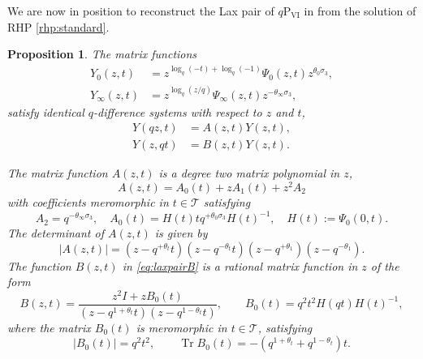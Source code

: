 \documentclass[a4paper,reqno,11pt]{amsart}
\numberwithin{equation}{section}
\numberwithin{figure}{section}
\theoremstyle{plain}
\newtheorem{proposition}[theorem]{Proposition}
\theoremstyle{remark}
\newcommand\Psix{\textrm{P}_{\textrm{VI}}}
\newcounter{rhp}
\numberwithin{rhp}{section}
\begin{document}
We are now in position to reconstruct the Lax pair of $q\Psix$ in \cite{jimbosakai} from the solution of RHP \ref{rhp:standard}.
\begin{proposition}\label{prop:lax}
    The matrix functions
\begin{align*}
Y_0(z,t)&=z^{\log_q(-t)+\log_q(-1)}\Psi_0(z,t)z^{\theta_0\sigma_3},\\
Y_\infty(z,t)&=z^{\log_q(z/q)}\Psi_\infty(z,t) z^{-\theta_\infty\sigma_3},
\end{align*}
satisfy identical $q$-difference systems with respect to $z$ and $t$,
\begin{subequations}\label{eq:laxpair}
\begin{align}
   Y(qz,t)&=A(z,t)Y(z,t),\label{eq:laxpairA}\\
   Y(z,qt)&=B(z,t)Y(z,t). \label{eq:laxpairB}
\end{align}
\end{subequations}

The matrix function $A(z,t)$ is a degree two matrix polynomial in $z$,
\begin{equation}\label{eq:lin_sys}
   A(z,t)=A_0(t)+zA_1(t)+z^2 A_2
\end{equation}
with coefficients meromorphic in $t\in \mathcal{T}$ satisfying
\begin{equation}\label{eq:Amats}
A_2= q^{-\theta_\infty \sigma_3},\quad A_0(t)=H(t)t  q^{+\theta_0 \sigma_3}  H(t)^{-1},\quad H(t):=\Psi_0(0,t).
\end{equation}
The determinant of $A(z,t)$ is given by
\begin{equation}\label{eq:detA}
|A(z,t)|=(z-q^{+\theta_t}t)(z-q^{-\theta_t}t)(z-q^{+\theta_1})(z-q^{-\theta_1}).
\end{equation}
The function $B(z,t)$ in \eqref{eq:laxpairB} is a rational matrix function in $z$ of the form
\begin{equation*}
    B(z,t)=\frac{z^2I+zB_0(t)}{(z-q^{1+\theta_t}t)(z-q^{1-\theta_t}t)},\qquad B_0(t)=q^{2}t^{2}H(qt)H(t)^{-1},
\end{equation*}
where the matrix $B_0(t)$ is meromorphic in $t\in \mathcal{T}$, satisfying
\begin{equation*}
    |B_0(t)|=q^2 t^2,\qquad \operatorname{Tr} B_0(t)=-(q^{1+\theta_t}+q^{1-\theta_t})t.
\end{equation*}
\end{proposition}
\end{document}
